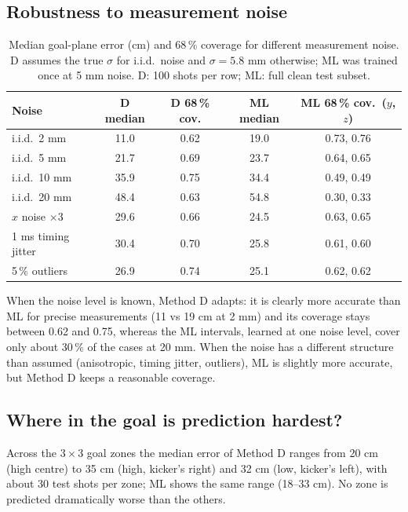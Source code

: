 \subsection{Robustness to measurement noise}
\begin{table}[H]
\centering
\caption{Median goal-plane error (cm) and 68\,\% coverage for different measurement noise. D assumes the true $\sigma$ for i.i.d.\ noise and $\sigma=5.8$ mm otherwise; ML was trained once at 5 mm noise. D: 100 shots per row; ML: full clean test subset.}
\label{tab:noise}
\small
\begin{tabular}{@{}lcccc@{}}
\toprule
Noise & D median & D 68\,\% cov. & ML median & ML 68\,\% cov.\ ($y$, $z$)\\
\midrule
i.i.d.\ 2 mm & 11.0 & 0.62 & 19.0 & 0.73, 0.76\\
i.i.d.\ 5 mm & 21.7 & 0.69 & 23.7 & 0.64, 0.65\\
i.i.d.\ 10 mm & 35.9 & 0.75 & 34.4 & 0.49, 0.49\\
i.i.d.\ 20 mm & 48.4 & 0.63 & 54.8 & 0.30, 0.33\\
$x$ noise $\times3$ & 29.6 & 0.66 & 24.5 & 0.63, 0.65\\
1 ms timing jitter & 30.4 & 0.70 & 25.8 & 0.61, 0.60\\
5\,\% outliers & 26.9 & 0.74 & 25.1 & 0.62, 0.62\\
\bottomrule
\end{tabular}
\end{table}
When the noise level is known, Method D adapts: it is clearly more accurate than ML for precise measurements (11 vs 19 cm at 2 mm) and its coverage stays between 0.62 and 0.75, whereas the ML intervals, learned at one noise level, cover only about 30\,\% of the cases at 20 mm. When the noise has a different structure than assumed (anisotropic, timing jitter, outliers), ML is slightly more accurate, but Method D keeps a reasonable coverage.

\subsection{Where in the goal is prediction hardest?}
Across the $3\times3$ goal zones the median error of Method D ranges from 20 cm (high centre) to 35 cm (high, kicker's right) and 32 cm (low, kicker's left), with about 30 test shots per zone; ML shows the same range (18--33 cm). No zone is predicted dramatically worse than the others.
